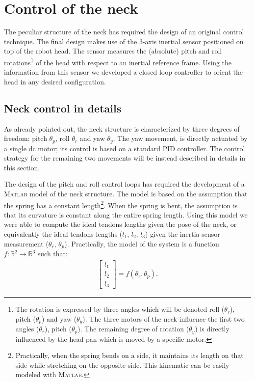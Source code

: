 \documentclass[9pt]{amsart}
\theoremstyle{definition}
\theoremstyle{remark}
\numberwithin{equation}{section}
\begin{document}
\section{Control of the neck} \label{Sec:NeckControl}

The peculiar structure of the neck has required the design of an original control technique. The final design makes use of the 3-axis inertial sensor positioned on top of the robot head. The sensor measures the (absolute) pitch and roll rotations\footnote{The rotation is expressed by three angles which will be denoted roll ($\theta_r$), pitch ($\theta_p$) and yaw ($\theta_y$). The three motors of the neck influence the first two angles ($\theta_r$), pitch ($\theta_p$). The remaining degree of rotation ($\theta_y$) is directly influenced by the head pan which is moved by a specific motor.} of the head with respect to an inertial reference frame. Using the information from this sensor we developed a closed loop controller to orient the head in any desired configuration. 

\subsection{Neck control in details}

As already pointed out, the neck structure is characterized by three degrees of freedom: pitch $\theta_p$, roll $\theta_r$ and yaw $\theta_y$. The yaw movement, is directly actuated by a single dc motor; its control is based on a standard PID controller. The control strategy for the remaining two movements will be instead described in details in this section.

The design of the pitch and roll control loops has required the development of a \textsc{Matlab} model of the neck structure. The model is based on the assumption that the spring has a constant length\footnote{Practically, when the spring bends on a side, it maintains its length on that side while stretching on the opposite side. This kinematic can be easily modeled with \textsc{Matlab}.}. When the spring is bent, the assumption is that its curvature is constant along the entire spring length. Using this model we were able to compute the ideal tendons lengths given the pose of the neck, or equivalently the ideal tendons lengths ($l_1$, $l_2$, $l_3$) given the inertia sensor measurement ($\theta_r$, $\theta_p$). Practically, the model of the system is a function $f: \mathbb R^2 \longrightarrow \mathbb R^3$ such that:
\begin{eqnarray} \label{Eq:Model_neck}
\begin{bmatrix}
l_1\\
l_2\\
l_3
\end{bmatrix} = f (\theta_r, \theta_p).
\end{eqnarray}
\end{document}
